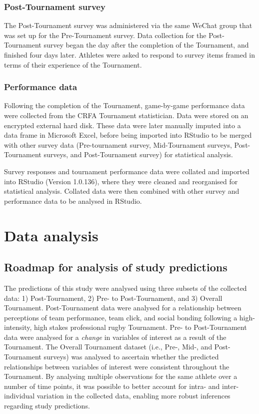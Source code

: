 \begin{CJK}{UTF8}{gbsn}
\subsubsection{Post-Tournament survey}
The Post-Tournament survey was administered via the same WeChat group that was set up for the Pre-Tournament survey. Data collection for the Post-Tournament survey began the day after the completion of the Tournament, and finished four days later. Athletes were asked to respond to survey items framed in terms of their experience of the Tournament.

\subsubsection{Performance data}
Following the completion of the Tournament, game-by-game performance data were collected from the CRFA Tournament statistician.  Data were stored on an encrypted external hard disk. These data were later manually imputed into a data frame in Microsoft Excel, before being imported into RStudio to be merged with other survey data (Pre-tournament survey, Mid-Tournament surveys, Post-Tournament surveys, and Post-Tournament survey) for statistical analysis.

Survey responses and tournament performance data were collated and imported into RStudio (Version 1.0.136), where they were cleaned and reorganised for statistical analysis. Collated data were then combined with other survey and performance data to be analysed in RStudio.






\clearpage
\section{Data analysis}



\subsection{Roadmap for analysis of study predictions}
The predictions of this study were analysed using three subsets of the collected data: 1) Post-Tournament, 2) Pre- to Post-Tournament, and 3) Overall Tournament.  Post-Tournament data were analysed for a relationship between perceptions of team performance, team click, and social bonding following a high-intensity, high stakes professional rugby Tournament. Pre- to Post-Tournament data were analysed for a \textit{change} in variables of interest as a result of the Tournament.  The Overall Tournament dataset (i.e., Pre-, Mid-, and Post-Tournament surveys) was analysed to ascertain whether the predicted relationships between variables of interest were consistent throughout the Tournament.  By analysing multiple observations for the same athlete over a number of time points, it was possible to better account for intra- and inter-individual variation in the collected data, enabling more robust inferences regarding study predictions.


\end{CJK}
